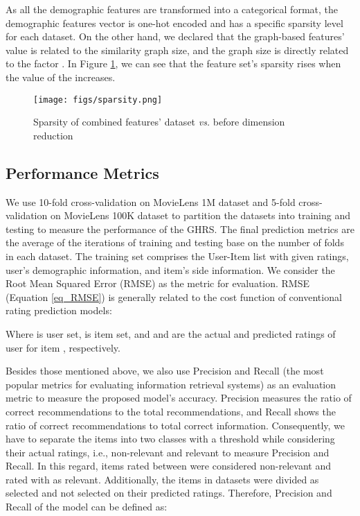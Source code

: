 \documentclass[a4paper,fleqn]{cas-dc}
\begin{document}
As all the demographic features are transformed into a categorical format, the demographic features vector is one-hot encoded and has a specific sparsity level for each dataset. On the other hand, we declared that the graph-based features' value is related to the similarity graph size, and the graph size is directly related to the factor . In Figure \ref{FIG:06}, we can see that the feature set's sparsity rises when the value of the  increases.

\begin{figure}
	\centering
	\texttt{[image: figs/sparsity.png]}
	\caption{Sparsity of combined features' dataset \textit{vs.}  before dimension reduction}
	\label{FIG:06}
\end{figure}


\subsection{Performance Metrics}
\label{metrics}
We use 10-fold cross-validation on MovieLens 1M dataset and 5-fold cross-validation on MovieLens 100K dataset to partition the datasets into training and testing to measure the performance of the GHRS. The final prediction metrics are the average of the iterations of training and testing base on the number of folds in each dataset. The training set comprises the User-Item list with given ratings, user's demographic information, and item's side information. We consider the Root Mean Squared Error (RMSE) as the metric for evaluation. RMSE (Equation \ref{eq_RMSE}) is generally related to the cost function of conventional rating prediction models:



Where  is user set,  is item set, and  and  are the actual and predicted ratings of user  for item , respectively.

Besides those mentioned above, we also use Precision and Recall (the most popular metrics for evaluating information retrieval systems) as an evaluation metric to measure the proposed model's accuracy. Precision measures the ratio of correct recommendations to the total recommendations, and Recall shows the ratio of correct recommendations to total correct information. Consequently, we have to separate the items into two classes with a threshold while considering their actual ratings, i.e., non-relevant and relevant to measure Precision and Recall. In this regard, items rated between  were considered non-relevant and rated with  as relevant. Additionally, the items in datasets were divided as selected and not selected on their predicted ratings. Therefore, Precision and Recall of the model can be defined as:
\end{document}

